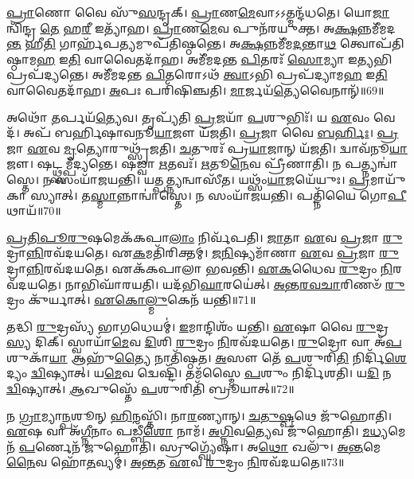 \-\ul{𑌪𑍍𑌰𑌾}\-𑌣𑍋 𑌵𑍈 𑌸𑍁᳴\-\ul{𑌸}\-𑌨𑍍𑌦𑍃𑌕𑍍।
\-\ul{𑌪𑍍𑌰𑌾}\-𑌣\-\ul{𑌮𑍇}\-𑌵𑌾𑌽𑌽𑌤𑍍𑌮𑌨𑍍𑌦᳴𑌧𑌤𑍇।
𑌯𑍋\-\ul{𑌜𑌾} 𑌨𑍍𑌵𑌿᳴𑌨𑍍𑌦𑍍𑌰 \ul{𑌤𑍇} 𑌹\-\ul{𑌰𑍀} 𑌇𑌤𑍍𑌯𑌾᳴𑌹।
\-\ul{𑌪𑍍𑌰𑌾}\-𑌣\-\ul{𑌮𑍇}\-𑌵 𑌪𑍁𑌨᳴𑌰𑌯𑍁𑌕𑍍𑌤।
𑌅\-\ul{𑌕𑍍𑌷}\-𑌨𑍍𑌨𑌮𑍀᳴𑌮𑌦\-\ul{𑌨𑍍𑌤} 𑌹𑍀\-\ul{𑌤𑌿} 𑌗𑌾𑌰𑍍\mbox{}𑌹᳴𑌪\-\ul{𑌤𑍍𑌯}\-𑌮𑍁𑌪᳴𑌤𑌿𑌷𑍍𑌠𑌨𑍍𑌤𑍇।
𑌅\-\ul{𑌕𑍍𑌷}\-𑌨𑍍𑌨𑌮𑍀᳴𑌮\-\ul{𑌦}\-𑌨𑍍𑌤𑌾\-\ul{𑌥} 𑌤𑍍𑌵𑍋𑌪᳴𑌤𑌿𑌷𑍍𑌠𑌾𑌮\-\ul{𑌹} 𑌇\-\ul{𑌤𑌿} 𑌵𑌾𑌵𑍈𑌤𑌦𑌾᳴𑌹।
𑌅𑌮𑍀᳴𑌮𑌦𑌨𑍍𑌤 \ul{𑌪𑌿}\-𑌤𑌰𑌃᳴ \ul{𑌸𑍋}\-𑌮𑍍𑌯𑌾 𑌇\-\ul{𑌤𑍍𑌯}\-𑌭𑌿 𑌪𑍍𑌰𑌪᳴𑌦𑍍𑌯𑌨𑍍𑌤𑍇।
𑌅𑌮𑍀᳴𑌮𑌦𑌨𑍍𑌤 \ul{𑌪𑌿}\-𑌤𑌰𑍋𑌽𑌥᳴ \ul{𑌤𑍍𑌵𑌾}\-𑌽𑌭𑌿 𑌪𑍍𑌰𑌪᳴𑌦𑍍𑌯𑌾𑌮\-\ul{𑌹} 𑌇\-\ul{𑌤𑌿} 𑌵𑌾𑌵𑍈𑌤𑌦𑌾᳴𑌹।
\-\ul{𑌅}\-𑌪𑌃 𑌪𑌰𑌿᳴𑌷𑌿𑌞𑍍𑌚𑌤𑌿।
\-\ul{𑌮𑌾}\-𑌰𑍍𑌜𑌯᳴\-\ul{𑌤𑍍𑌯𑍇}\-𑌵𑍈𑌨𑌾𑌨𑍍᳴॥69॥

𑌅𑌥𑍋᳴ \ul{𑌤}\-𑌰𑍍𑌪𑌯᳴\-\ul{𑌤𑍍𑌯𑍇}\-𑌵।
𑌤𑍃𑌪𑍍𑌯᳴𑌤𑌿 \ul{𑌪𑍍𑌰}\-𑌜𑌯𑌾᳴ \ul{𑌪}\-𑌶𑍁𑌭𑌿𑌃᳴।
𑌯 \ul{𑌏}\-𑌵𑌂 𑌵𑍇𑌦᳴।
𑌅𑌪᳴ 𑌬𑌰𑍍\mbox{}𑌹𑌿𑌷𑌾𑌵𑌨𑍂\-\ul{𑌯𑌾}\-𑌜𑍗 𑌯᳴𑌜𑌤𑌿।
\-\ul{𑌪𑍍𑌰}\-𑌜𑌾 𑌵𑍈 \ul{𑌬}\-\-\ul{𑌰𑍍}\-𑌹𑌿𑌃।
\-\ul{𑌪𑍍𑌰}\-𑌜𑌾 \ul{𑌏}\-𑌵 \ul{𑌮𑍃}\-𑌤𑍍𑌯𑍋𑌰𑍁𑌥𑍍𑌸𑍃᳴𑌜𑌤𑌿।
\-\ul{𑌚}\-𑌤𑍁𑌰𑌃᳴ 𑌪𑍍𑌰\-\ul{𑌯𑌾}\-𑌜𑌾𑌨𑍍 𑌯᳴𑌜𑌤𑌿।
𑌦𑍍𑌵𑌾𑌵᳴𑌨𑍂\-\ul{𑌯𑌾}\-𑌜𑍗।
𑌷𑌟𑍍𑌥𑍍𑌸𑌮𑍍𑌪᳴𑌦𑍍𑌯𑌨𑍍𑌤𑍇।
𑌷𑌡𑍍𑌵𑌾 \ul{𑌋}\-𑌤𑌵𑌃᳴।
\-\ul{𑌋}\-𑌤𑍂\-\ul{𑌨𑍇}\-𑌵 𑌪𑍍𑌰𑍀᳴𑌣𑌾𑌤𑌿।
𑌨 𑌪𑌤𑍍𑌨𑍍𑌯𑌨𑍍𑌵𑌾॑𑌸𑍍𑌤𑍇।
𑌨 𑌸𑌂𑌯𑌾᳴𑌜𑌯𑌨𑍍𑌤𑌿।
𑌯𑌤𑍍𑌪\-\ul{𑌤𑍍𑌨𑍍𑌯}\-𑌨𑍍𑌵𑌾𑌸𑍀᳴𑌤।
𑌯𑌥𑍍𑌸𑌂᳴\-\ul{𑌯𑌾}\-𑌜𑌯𑍇᳴𑌯𑍁𑌃।
\-\ul{𑌪𑍍𑌰}\-𑌮𑌾𑌯𑍁᳴𑌕𑌾 𑌸𑍍𑌯𑌾𑌤𑍍।
𑌤\-\ul{𑌸𑍍𑌮𑌾}\-𑌨𑍍𑌨𑌾𑌨𑍍𑌵𑌾॑𑌸𑍍𑌤𑍇।
𑌨 𑌸𑌂𑌯𑌾᳴𑌜𑌯𑌨𑍍𑌤𑌿।
𑌪𑌤𑍍𑌨𑌿᳴𑌯𑍈 𑌗𑍋\-\ul{𑌪𑍀}\-𑌥𑌾𑌯᳴॥70॥\anuvakamend[𑌹𑍋𑌤𑌾᳴\-\ul{𑌰}\-𑌮𑌾𑌜𑍍𑌯᳴𑌭𑌾𑌗𑍗 𑌯𑌜\-\ul{𑌤𑌿} 𑌸𑌨𑍍𑌤᳴\-\ul{𑌤}\-𑌮𑌵᳴𑌦𑍍𑌯\-\ul{𑌤𑌿} 𑌵𑍍𑌯𑌾𑌵𑍃᳴𑌤𑍍𑌤𑍍𑌯𑍈 𑌬𑌰𑍍\mbox{}\-\ul{𑌹𑌿}\-𑌷𑌦𑍋᳴ 𑌯𑌜\-\ul{𑌤𑌿} 𑌤\-\ul{𑌮𑍇}\-𑌵 𑌤𑌦𑍍𑌯᳴\-\ul{𑌜}\-𑌤𑍍𑌯\-\ul{𑌨𑍁} 𑌨𑌿𑌷𑍍𑌕𑍍𑌰𑌾᳴𑌮𑌨𑍍𑌤𑍍𑌯𑌾𑌹𑍈𑌨𑌾\-\ul{𑌨𑍃}\-𑌤\-\ul{𑌵𑍋} 𑌨𑌵᳴ 𑌚]

\-\ul{𑌪𑍍𑌰}\-\-\ul{𑌤𑌿}\-\-\ul{𑌪𑍂}\-\-\ul{𑌰𑍁}\-𑌷𑌮𑍇𑌕᳴𑌕𑌪𑌾\-\ul{𑌲𑌾𑌂} 𑌨𑌿𑌰𑍍𑌵᳴𑌪𑌤𑌿।
\-\ul{𑌜𑌾}\-𑌤𑌾 \ul{𑌏}\-𑌵 \ul{𑌪𑍍𑌰}\-𑌜𑌾 \ul{𑌰𑍁}\-𑌦𑍍𑌰𑌾\-\ul{𑌨𑍍𑌨𑌿}\-𑌰𑌵᳴𑌦𑌯𑌤𑍇।
𑌏\-\ul{𑌕}\-𑌮𑌤𑌿᳴𑌰𑌿𑌕𑍍𑌤𑌮𑍍।
\-\ul{𑌜}\-\-\ul{𑌨𑌿}\-𑌷𑍍𑌯𑌮𑌾᳴𑌣𑌾 \ul{𑌏}\-𑌵 \ul{𑌪𑍍𑌰}\-𑌜𑌾 \ul{𑌰𑍁}\-𑌦𑍍𑌰𑌾\-\ul{𑌨𑍍𑌨𑌿}\-𑌰𑌵᳴𑌦𑌯𑌤𑍇।
𑌏𑌕᳴𑌕𑌪𑌾𑌲𑌾 𑌭𑌵𑌨𑍍𑌤𑌿।
\-\ul{𑌏}\-\-\ul{𑌕}\-𑌧𑍈𑌵 \ul{𑌰𑍁}\-𑌦𑍍𑌰𑌂 \ul{𑌨𑌿}\-𑌰𑌵᳴𑌦𑌯𑌤𑍇।
𑌨𑌾𑌭𑌿𑌘𑌾᳴𑌰𑌯𑌤𑌿।
𑌯𑌦᳴𑌭𑌿\-\ul{𑌘𑌾}\-𑌰𑌯𑍇॑𑌤𑍍।
\-\ul{𑌅}\-\-\ul{𑌨𑍍𑌤}\-\-\ul{𑌰}\-\-\ul{𑌵}\-\-\ul{𑌚𑌾}\-𑌰𑌿𑌣𑍞᳴ \ul{𑌰𑍁}\-𑌦𑍍𑌰𑌂 𑌕𑍁᳴𑌰𑍍𑌯𑌾𑌤𑍍।
\-\ul{𑌏}\-\-\ul{𑌕𑍋}\-\-\ul{𑌲𑍍𑌮𑍁}\-𑌕𑍇𑌨᳴ 𑌯𑌨𑍍𑌤𑌿॥71॥

𑌤𑌦𑍍𑌧𑌿 \ul{𑌰𑍁}\-𑌦𑍍𑌰𑌸𑍍𑌯᳴ 𑌭𑌾\-\ul{𑌗}\-𑌧𑍇𑌯𑌮𑍍॑।
\-\ul{𑌇}\-𑌮𑌾𑌨𑍍𑌦𑌿𑌶𑌂᳴ 𑌯𑌨𑍍𑌤𑌿।
\-\ul{𑌏}\-𑌷𑌾 𑌵𑍈 \ul{𑌰𑍁}\-𑌦𑍍𑌰\-\ul{𑌸𑍍𑌯} 𑌦𑌿𑌕𑍍।
𑌸𑍍𑌵𑌾𑌯𑌾᳴\-\ul{𑌮𑍇}\-𑌵 \ul{𑌦𑌿}\-𑌶𑌿 \ul{𑌰𑍁}\-𑌦𑍍𑌰𑌂 \ul{𑌨𑌿}\-𑌰𑌵᳴𑌦𑌯𑌤𑍇।
\-\ul{𑌰𑍁}\-𑌦𑍍𑌰𑍋 𑌵𑌾 𑌅᳴\-\ul{𑌪}\-𑌶𑍁𑌕𑌾᳴\-\ul{𑌯𑌾} 𑌆𑌹𑍁᳴\-\ul{𑌤𑍍𑌯𑍈} 𑌨𑌾𑌤𑌿᳴𑌷𑍍𑌠𑌤।
\-\ul{𑌅}\-𑌸𑍗 𑌤𑍇᳴ \ul{𑌪}\-𑌶𑍁𑌰𑌿\-\ul{𑌤𑌿} 𑌨𑌿𑌰𑍍𑌦𑌿᳴\-\ul{𑌶𑍇}\-𑌦𑍍𑌯𑌂 \ul{𑌦𑍍𑌵𑌿}\-𑌷𑍍𑌯𑌾𑌤𑍍।
𑌯\-\ul{𑌮𑍇}\-𑌵 𑌦𑍍𑌵𑍇𑌷𑍍𑌟𑌿᳴।
𑌤𑌮᳴𑌸𑍍𑌮𑍈 \ul{𑌪}\-𑌶𑍁𑌂 𑌨𑌿𑌰𑍍𑌦𑌿᳴𑌶𑌤𑌿।
𑌯\-\ul{𑌦𑌿} 𑌨 \ul{𑌦𑍍𑌵𑌿}\-𑌷𑍍𑌯𑌾𑌤𑍍।
\-\ul{𑌆}\-𑌖𑍁𑌸𑍍𑌤𑍇᳴ \ul{𑌪}\-𑌶𑍁𑌰𑌿𑌤𑌿᳴ 𑌬𑍍𑌰𑍂𑌯𑌾𑌤𑍍॥72॥

𑌨 \ul{𑌗𑍍𑌰𑌾}\-𑌮𑍍𑌯𑌾\-\ul{𑌨𑍍𑌪}\-𑌶𑍂𑌨𑍍 \ul{𑌹𑌿}\-𑌨𑌸𑍍𑌤𑌿᳴।
𑌨𑌾\-\ul{𑌰}\-𑌣𑍍𑌯𑌾𑌨𑍍।
\-\ul{𑌚}\-\-\ul{𑌤𑍁}\-\-\ul{𑌷𑍍𑌪}\-𑌥𑍇 𑌜𑍁᳴𑌹𑍋𑌤𑌿।
\-\ul{𑌏}\-𑌷 𑌵𑌾 𑌅᳴\-\ul{𑌗𑍍𑌨𑍀}\-𑌨𑌾𑌂 𑌪𑌡𑍍𑌬𑍀᳴\-\ul{𑌶𑍋} 𑌨𑌾𑌮᳴।
\-\ul{𑌅}\-\-\ul{𑌗𑍍𑌨𑌿}\-𑌵\-\ul{𑌤𑍍𑌯𑍇}\-𑌵 𑌜𑍁᳴𑌹𑍋𑌤𑌿।
\-\ul{𑌮}\-\-\ul{𑌧𑍍𑌯}\-𑌮𑍇𑌨᳴ \ul{𑌪}\-𑌰𑍍𑌣𑍇𑌨᳴ 𑌜𑍁𑌹𑍋𑌤𑌿।
𑌸𑍍𑌰𑍁𑌗𑍍𑌘𑍍𑌯𑍇᳴𑌷𑌾।
𑌅\-\ul{𑌥𑍋} 𑌖𑌲𑍁᳴।
\-\ul{𑌅}\-\-\ul{𑌨𑍍𑌤}\-𑌮𑍇\-\ul{𑌨𑍈}\-𑌵 𑌹𑍋᳴\-\ul{𑌤}\-𑌵𑍍𑌯𑌮𑍍॑।
\-\ul{𑌅}\-\-\ul{𑌨𑍍𑌤}\-𑌤 \ul{𑌏}\-𑌵 \ul{𑌰𑍁}\-𑌦𑍍𑌰𑌂 \ul{𑌨𑌿}\-𑌰𑌵᳴𑌦𑌯𑌤𑍇॥73॥

